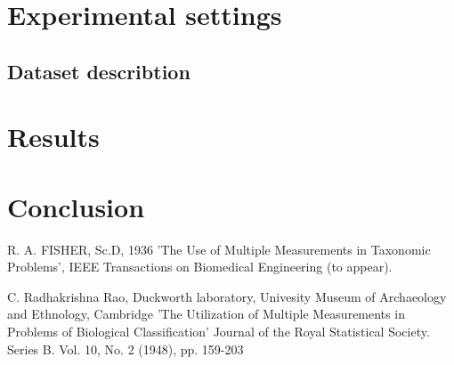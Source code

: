 \documentclass[twocolumn]{paper}
\begin{document}
\section{Experimental settings}

\subsection{Dataset describtion}

\section{Results}

\section{Conclusion}

\newpage
\begin{thebibliography}{9}

R. A. FISHER, Sc.D, 1936
'The Use of Multiple Measurements in Taxonomic Problems', 
IEEE Transactions on Biomedical Engineering (to appear).

C. Radhakrishna Rao, Duckworth laboratory, Univesity Museum of Archaeology and Ethnology, Cambridge
'The Utilization of Multiple Measurements in Problems of Biological Classification'
Journal of the Royal Statistical Society. Series B. Vol. 10, No. 2 (1948), pp. 159-203

\end{thebibliography}
\newpage
\end{document}
